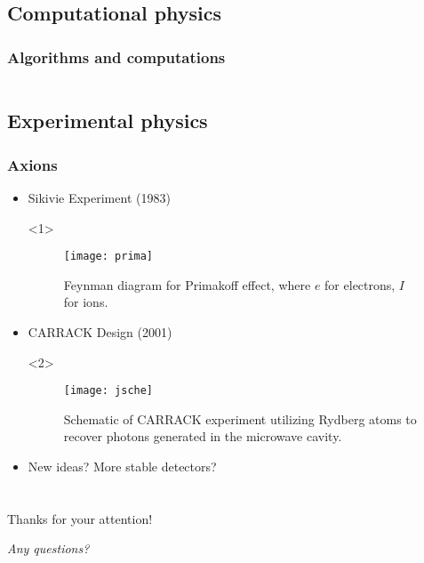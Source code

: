 \documentclass{beamer}
\begin{document}
\subsection{Computational physics}
\begin{frame}
  \frametitle{Algorithms and computations}
  \begin{columns}
    
    
  \end{columns}
  
\end{frame}

\subsection{Experimental physics}
\begin{frame}
  \frametitle{Axions}
  \begin{itemize}
  \item<1-> Sikivie Experiment (1983)
    \begin{onlyenv}<1>
      \begin{figure}
        \caption{Feynman diagram for Primakoff effect, where $e$ for
          electrons, $I$ for ions.} 
        \centering
        \texttt{[image: prima]}
      \end{figure}
    \end{onlyenv}
  \item<2-> CARRACK Design (2001)
    \begin{onlyenv}<2>
      \begin{figure}
        \centering
    \texttt{[image: jsche]}
    \caption{Schematic of CARRACK experiment utilizing Rydberg
      atoms to recover photons generated in the microwave
      cavity.} 
      \end{figure}
    \end{onlyenv}
  \item<3-> New ideas? More stable detectors?
  \end{itemize}
\end{frame}

\section{}
\begin{frame}
  \begin{center}
    \Huge{\alert{Thanks for your attention!}}\par
    \Huge{\textit{Any questions?}}
  \end{center}
  
\end{frame}
\end{document}
